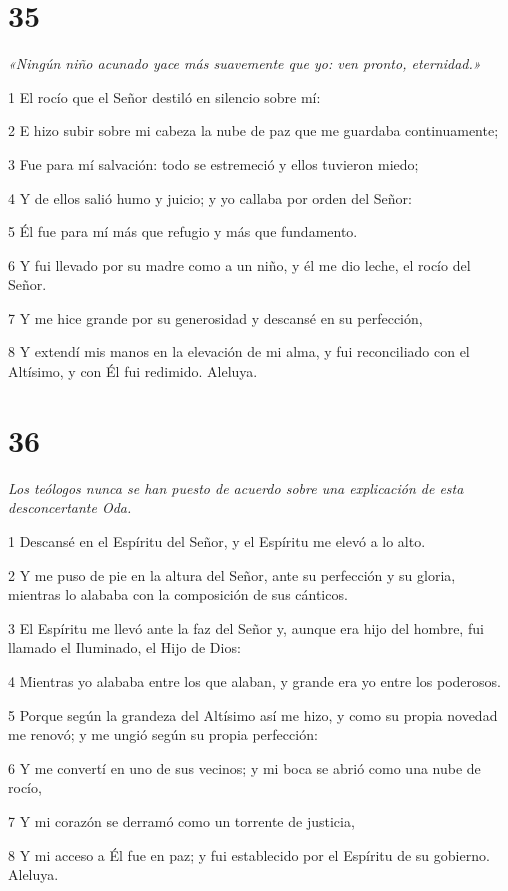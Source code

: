 \chapter{35}

\par \textit{«Ningún niño acunado yace más suavemente que yo: ven pronto, eternidad.»}

\par 1 El rocío que el Señor destiló en silencio sobre mí:
\par 2 E hizo subir sobre mi cabeza la nube de paz que me guardaba continuamente;
\par 3 Fue para mí salvación: todo se estremeció y ellos tuvieron miedo;
\par 4 Y de ellos salió humo y juicio; y yo callaba por orden del Señor:
\par 5 Él fue para mí más que refugio y más que fundamento.
\par 6 Y fui llevado por su madre como a un niño, y él me dio leche, el rocío del Señor.
\par 7 Y me hice grande por su generosidad y descansé en su perfección,
\par 8 Y extendí mis manos en la elevación de mi alma, y ​​fui reconciliado con el Altísimo, y con Él fui redimido. Aleluya.

\chapter{36}

\par \textit{Los teólogos nunca se han puesto de acuerdo sobre una explicación de esta desconcertante Oda.}

\par 1 Descansé en el Espíritu del Señor, y el Espíritu me elevó a lo alto.
\par 2 Y me puso de pie en la altura del Señor, ante su perfección y su gloria, mientras lo alababa con la composición de sus cánticos.
\par 3 El Espíritu me llevó ante la faz del Señor y, aunque era hijo del hombre, fui llamado el Iluminado, el Hijo de Dios:
\par 4 Mientras yo alababa entre los que alaban, y grande era yo entre los poderosos.
\par 5 Porque según la grandeza del Altísimo así me hizo, y como su propia novedad me renovó; y me ungió según su propia perfección:
\par 6 Y me convertí en uno de sus vecinos; y mi boca se abrió como una nube de rocío,
\par 7 Y mi corazón se derramó como un torrente de justicia,
\par 8 Y mi acceso a Él fue en paz; y fui establecido por el Espíritu de su gobierno. Aleluya.

